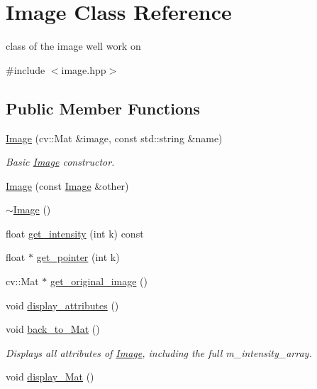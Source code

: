 \hypertarget{class_image}{}\section{Image Class Reference}
\label{class_image}


class of the image we\textquotesingle{}ll work on  




{\ttfamily \#include $<$image.\+hpp$>$}

\subsection*{Public Member Functions}
\begin{DoxyCompactItemize}
\item 
\hyperlink{class_image_ae39428477b96676d7a6eb0c1778a44e9}{Image} (cv\+::\+Mat \&image, const std\+::string \&name)
\begin{DoxyCompactList}\small\item\em Basic \hyperlink{class_image}{Image} constructor. \end{DoxyCompactList}\item 
\hyperlink{class_image_a5a3bc57bd7ba53f9ae55b1963b9ba0a1}{Image} (const \hyperlink{class_image}{Image} \&other)
\item 
\hyperlink{class_image_a0294f63700543e11c0f0da85601c7ae5}{$\sim$\+Image} ()
\item 
float \hyperlink{class_image_ac4485f01ef5b1e741e8c2eaee781f2ab}{get\+\_\+intensity} (int k) const
\item 
float $\ast$ \hyperlink{class_image_a71ce9c6b5c2ac2c67a6c0ef807806fe1}{get\+\_\+pointer} (int k)
\item 
cv\+::\+Mat $\ast$ \hyperlink{class_image_aec03ea9e28674da4821f28c984bfe3a8}{get\+\_\+original\+\_\+image} ()
\item 
void \hyperlink{class_image_a9f86b6ca3d6237ffdaeece483b9e2f62}{display\+\_\+attributes} ()
\item 
void \hyperlink{class_image_a6a8a05862fa0157c8602fd760b347920}{back\+\_\+to\+\_\+\+Mat} ()
\begin{DoxyCompactList}\small\item\em Displays all attributes of \hyperlink{class_image}{Image}, including the full m\+\_\+intensity\+\_\+array. \end{DoxyCompactList}\item 
void \hyperlink{class_image_af92bb3e91201b76a9a0ccc642fb29a07}{display\+\_\+\+Mat} ()
\item 

\end{DoxyCompactItemize}
